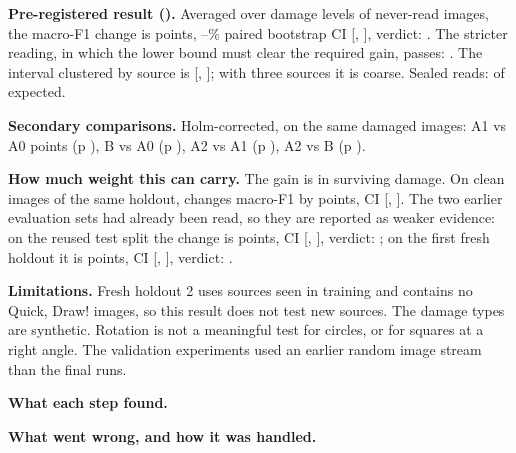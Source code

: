 \documentclass[11pt]{article}
\providecommand{\CILevelPct}{--}
\begin{document}
\textbf{Pre-registered result (\IthreePrimary).} Averaged over \IthreeLevels{}
damage levels of \IthreeN{} never-read images, the macro-F1 change is
\IthreeDelta{} points, \CILevelPct\% paired bootstrap CI
[\IthreeCILo, \IthreeCIHi], verdict: \textbf{\IthreeVerdict}. The stricter
reading, in which the lower bound must clear the required gain, passes:
\IthreeStrict. The interval clustered by source is
[\IthreeSourceCILo, \IthreeSourceCIHi]; with three sources it is coarse. Sealed
reads: \IthreeReads{} of \IthreeReadsExpected{} expected.

\textbf{Secondary comparisons.} Holm-corrected, on the same damaged images:
A1 vs A0 \IthreeSecAoneAzeroDelta{} points (p \IthreeSecAoneAzeroP),
B vs A0 \IthreeSecBAzeroDelta{} (p \IthreeSecBAzeroP),
A2 vs A1 \IthreeSecAtwoAoneDelta{} (p \IthreeSecAtwoAoneP),
A2 vs B \IthreeSecAtwoBDelta{} (p \IthreeSecAtwoBP).

\textbf{How much weight this can carry.} The gain is in surviving damage. On
clean images of the same holdout, \IthreePrimary{} changes macro-F1 by
\IthreeCleanDelta{} points, CI [\IthreeCleanCILo, \IthreeCleanCIHi]. The two
earlier evaluation sets had already been read, so they are reported as weaker
evidence: on the reused test split the change is \IthreeTestDelta{} points,
CI [\IthreeTestCILo, \IthreeTestCIHi], verdict: \IthreeTestVerdict; on the first
fresh holdout it is \IthreeFreshDelta{} points,
CI [\IthreeFreshCILo, \IthreeFreshCIHi], verdict: \IthreeFreshVerdict.

\textbf{Limitations.} Fresh holdout 2 uses sources seen in training and contains
no Quick, Draw! images, so this result does not test new sources. The damage
types are synthetic. Rotation is not a meaningful test for circles, or for
squares at a right angle. The validation experiments used an earlier random
image stream than the final runs.

\begin{table}[H]
\centering
\caption{Iteration 3 comparisons on damaged images of fresh holdout 2.}
\small
{}
\end{table}

\textbf{What each step found.}

{\small{}}

\textbf{What went wrong, and how it was handled.}
\end{document}
